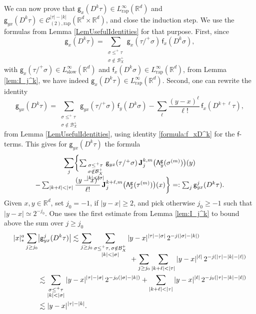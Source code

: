 \documentclass[10pt]{amsart}
\theoremstyle{plain}
\theoremstyle{definition}
\newcommand{\rap}{\mathrm{rap}}
\newcommand{\slow}{\mathrm{slow}}
\newcommand{\bfJ}{\mathbf{J}}
\newcommand{\sff}{\mathsf{f}}
\newcommand{\sfg}{\mathsf{g}}
\newcommand{\bbR}{\mathbb{R}}
\newcommand{\mcB}{\mathcal{B}}
\newcommand{\mcC}{\mathcal{C}}
\begin{document}
We can now prove that $\sfg_x(D^k\tau)\in L_\rap^\infty(\bbR^d)$ and ${\sfg}_{yx}(D^k\tau)\in\mcC^{|\tau|-|k|}_{(2),\rap}(\bbR^d\times\bbR^d)$, and close the induction step. We use the formulas from Lemma \ref{LemUsefulIdentities} for that purpose. First, since
\[
\sfg_x(D^k\tau) = \sum_{\substack{\sigma\leq^+\tau\\\sigma\notin\mcB_X^+}} \sfg_x(\tau/^+\sigma)\,\sff_x(D^k\sigma),
\]
with $\sfg_x(\tau/^+\sigma)\in L_\slow^\infty(\bbR^d)$ and $\sff_x(D^k\sigma)\in L_\rap^\infty(\bbR^d)$, from Lemma \ref{lem:I_j^k}, we have indeed $\sfg_x(D^k\tau)\in L_\rap^\infty(\bbR^d)$. Second, one can rewrite the identity
\[
\sfg_{yx}(D^k\tau) = \sum_{\substack{\sigma\leq^+\tau\\\sigma\notin\mcB_X^+}} \sfg_{yx}(\tau/^+\sigma)\,\sff_y(D^k\sigma) - \sum_{\ell}\frac{(y-x)^\ell}{\ell!}\,\sff_x(D^{k+\ell}\tau),
\]
from Lemma \ref{LemUsefulIdentities}, using identity \eqref{formula:f_xD^k} for the $\sff$-terms. This gives for $\sfg_{yx}(D^k\tau)$ the formula
\begin{multline*}
\sum_j
\biggl\{
\textstyle\sum_{\substack{\sigma\le^+\tau\\ \sigma\notin\mcB_X^+\\|k|<|\sigma|}} \sfg_{yx}(\tau/^+\sigma)\,\bfJ_j^{k,m}\bigl({\sf\Lambda}^{\sfg}_y(\sigma^{(m)})\bigr)(y)\\[-10pt]
\textstyle - \sum_{|k+\ell|<|\tau|}\dfrac{(y-x)^\ell}{\ell!}\,\bfJ_j^{k+\ell, m}\bigl({\sf\Lambda}^{\sfg}_x(\tau^{(m)})\bigr)(x)
\biggr\}=: \sum_j\sfg_{yx}^j(D^k\tau).
\end{multline*}
Given $x,y\in\bbR^d$, set $j_0=-1$, if $|y-x|\ge2$, and pick otherwise $j_0\ge-1$ such that $|y-x|\simeq2^{-j_0}$. One uses the first estimate from Lemma \ref{lem:I_j^k} to bound above the sum over $j\ge j_0$
\begin{equation}
\begin{split} \label{EqEstimate}
|x|_*^a\sum_{j\ge j_0}&\big|\sfg_{yx}^j(D^k\tau)\big| \lesssim \sum_{j\ge j_0}\sum_{\substack{\sigma\le^+\tau,\,\sigma\notin\mcB_X^+\\|k|<|\sigma|}} |y-x|^{|\tau|-|\sigma|}\,2^{-j(|\sigma|-|k|)}\\[-10pt]
&\hspace*{4.6cm}+ \sum_{j\ge j_0}\sum_{|k+\ell|<|\tau|}|y-x|^{|\ell|}\,2^{-j(|\tau|-|k|-|\ell|)}\\
&\lesssim \sum_{\substack{\sigma\le^+\tau\\|k|<|\sigma|}} |y-x|^{|\tau|-|\sigma|}\,2^{-j_0(|\sigma|-|k|)} + \sum_{|k+\ell|<|\tau|}|y-x|^{|\ell|}\,2^{-j_0(|\tau|-|k|-|\ell|)} \\
&\lesssim|y-x|^{|\tau|-|k|}.
\end{split}
\end{equation}
\end{document}
